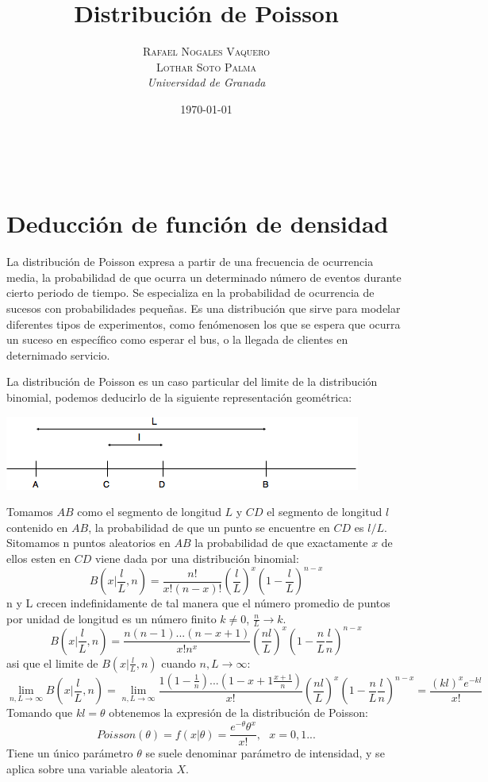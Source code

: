 \documentclass[a4paper, 10pt]{article} %
\title{\textbf{Distribución de Poisson}\\ %
\vspace{20 pt}
} %
\author{\textsc{Rafael Nogales Vaquero\\
Lothar Soto Palma} %
\\{\textit{Universidad de Granada}}} %
\date{\today} %
\makeatletter
\renewcommand{\maketitle}{ %
\begin{center} %
{\Huge\@title} %
\end{center}

\vspace{20pt} %

\begin{flushright} %
{\large\@author} %
\\\@date %

\vspace{40pt} %
\end{flushright}
\renewcommand{\baselinestretch}{0.5}

}
\makeatother
\begin{document}
\maketitle
\tableofcontents
\setcounter{page}{1}
\pagebreak
\section{Deducción de función de densidad}
La distribución de Poisson expresa a partir de una frecuencia de ocurrencia media, la probabilidad de que ocurra un determinado número de eventos durante cierto periodo de tiempo. Se especializa en la probabilidad de ocurrencia de sucesos con probabilidades pequeñas. Es una distribución que sirve para modelar diferentes tipos de experimentos, como fenómenosen los que se espera que ocurra un suceso en específico como esperar el bus, o la llegada de clientes en deternimado servicio.

La distribución de Poisson es un caso particular del limite de la distribución binomial, podemos deducirlo de la siguiente representación geométrica:\\
\begin{center}
\includegraphics[scale=0.6]{1.png} 
\end{center}
Tomamos $AB$ como el segmento de longitud $L$ y $CD$ el segmento de longitud $l$ contenido en $AB$, la probabilidad de que un punto se encuentre en $CD$ es $l/L$. Sitomamos n puntos aleatorios en $AB$ la probabilidad de que exactamente $x$ de ellos esten en $CD$ viene dada por una distribución binomial:
$$B(x|\frac{l}{L},n)=\frac{n!}{x!(n-x)!}(\frac{l}{L})^x(1-\frac{l}{L})^{n-x}$$
n y L crecen indefinidamente de tal manera que el número promedio de puntos por unidad de longitud es un número finito $k \neq 0$, $\frac{n}{L}\rightarrow k$.
$$B(x|\frac{l}{L},n)=\frac{n(n-1)...(n-x+1)}{x!n^x}(\frac{nl}{L})^x(1-\frac{n}{L}\frac{l}{n})^{n-x}$$
asi que el limite de $B(x|\frac{l}{L},n)$ cuando $n,L\rightarrow \infty$:
$$\lim_{n,L\rightarrow \infty}B(x|\frac{l}{L},n) = \lim_{n,L\rightarrow \infty}\frac{1(1-\frac{1}{n})...(1-x+1\frac{x+1}{n})}{x!}(\frac{nl}{L})^x(1-\frac{n}{L}\frac{l}{n})^{n-x}=\frac{(kl)^xe^{-kl}}{x!}$$
Tomando que $kl=\theta$ obtenemos la expresión de la distribución de Poisson:
$$Poisson(\theta)=f(x|\theta)=\dfrac{e^{-\theta}\theta^x}{x!},\ \ \ x=0,1...$$
Tiene un único parámetro $\theta$ se suele denominar parámetro de intensidad, y se aplica sobre una variable aleatoria $X$.
\end{document}
